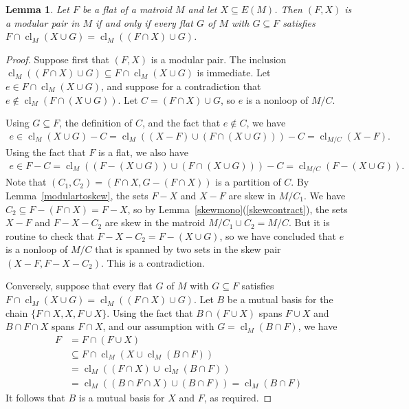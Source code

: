 \documentclass{amsart}
\theoremstyle{plain}
\newtheorem{lemma}[theorem]{Lemma}
\theoremstyle{definition}
\DeclareMathOperator{\cl}{cl}
\newcommand{\con}{/}
\newcommand{\br}[1]{\left(#1\right)}
\renewcommand{\ss}{\subseteq}
\begin{document}
\begin{lemma}\label{modulardistribpair}
  Let $F$ be a flat of a matroid $M$ and let $X \ss E(M)$. Then $(F,X)$ is a modular pair in $M$ 
  if and only if every flat $G$ of $M$ with $G \ss F$ satisfies $F \cap \cl_M(X \cup G) = \cl_M((F \cap X) \cup G)$. 
\end{lemma}
\begin{proof}
  Suppose first that $(F,X)$ is a modular pair. 
  The inclusion $\cl_M((F \cap X) \cup G) \ss F \cap \cl_M(X \cup G)$ is immediate. 
  Let $e \in F \cap \cl_M(X \cup G)$, 
  and suppose for a contradiction that $e \notin \cl_M(F \cap (X \cup G))$. 
  Let $C = (F \cap X) \cup G$, so $e$ is a nonloop of $M \con C$. 

  Using $G \ss F$, the definition of $C$, and the fact that $e \notin C$, we have 
  \begin{align*}
      e \in \cl_M(X \cup G) - C
      = \cl_M((X-F) \cup (F \cap (X \cup G))) - C
      = \cl_{M \con C}(X-F).
  \end{align*} 
  Using the fact that $F$ is a flat, we also have 
  \begin{align*}
    e \in F - C = \cl_M\br{(F - (X \cup G)) \cup (F \cap (X \cup G))} - C = \cl_{M \con C}(F - (X \cup G)).
  \end{align*}
  Note that $(C_1, C_2) = (F \cap X, G - (F \cap X))$ is a partition of $C$. 
  By Lemma~\ref{modulartoskew}, the sets $F - X$ and $X - F$ are skew in $M \con C_1$.
  We have $C_2 \ss F - (F \cap X) = F- X$,
  so by Lemma~\ref{skewmono}(\ref{skewcontract}), the sets $X-F$ and $F-X-C_2$ are skew in the matroid
  $M \con C_1 \cup C_2 = M \con C$. But it is routine to check that $F - X - C_2 = F - (X \cup G)$, 
  so we have concluded that $e$ is a nonloop of $M \con C$ that is spanned by two sets 
  in the skew pair $(X-F, F-X-C_2)$. This is a contradiction.  

  Conversely, suppose that every flat $G$ of $M$ with $G \ss F$ satisfies $F \cap \cl_M(X \cup G) = \cl_M((F \cap X) \cup G)$. 
  Let $B$ be a mutual basis for the chain $\{F \cap X, X, F \cup X\}$. 
  Using the fact that $B \cap (F \cup X)$ spans $F \cup X$ and $B \cap F \cap X$ spans $F \cap X$,
  and our assumption with $G = \cl_M(B \cap F)$, we have 
  \begin{align*}
    F &= F \cap (F \cup X)\\ 
    &\ss F \cap \cl_M(X \cup \cl_M(B \cap F)) \\
    &= \cl_M((F \cap X) \cup \cl_M(B \cap F)) \\
    & = \cl_M((B \cap F \cap X) \cup (B \cap F)) = \cl_M(B \cap F)
  \end{align*}
  It follows that $B$ is a mutual basis for $X$ and $F$, as required.   
\end{proof}
\end{document}
